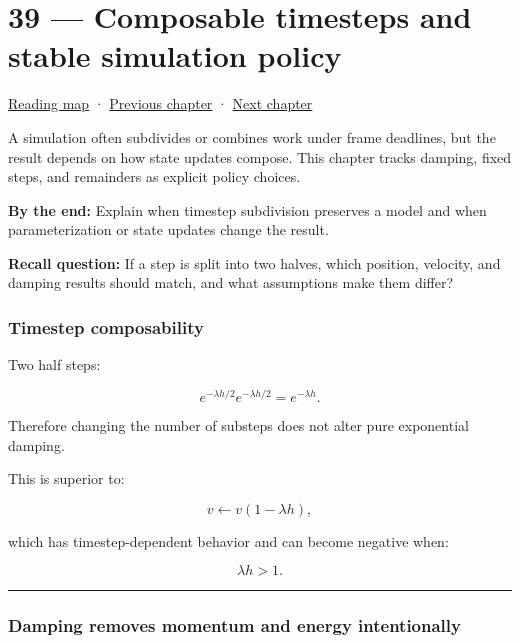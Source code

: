 \hypertarget{06-engine-ii-ch039}{}
\chapter{39 --- Composable timesteps and stable simulation policy}\label{06-engine-ii-ch039-composable-timesteps-and-stable-simulation-policy}

\hyperref[volume-reading-map]{Reading map} · \hyperref[06-engine-ii-ch038-integrator-choices-and-energy-drift]{Previous chapter} · \hyperref[06-engine-ii-ch040-coupled-contacts-and-iterative-response]{Next chapter}

A simulation often subdivides or combines work under frame deadlines, but the result depends on how state updates compose. This chapter tracks damping, fixed steps, and remainders as explicit policy choices.

\textbf{By the end:} Explain when timestep subdivision preserves a model and when parameterization or state updates change the result.

\textbf{Recall question:} If a step is split into two halves, which position, velocity, and damping results should match, and what assumptions make them differ?

\subsection{Timestep composability}\label{06-engine-ii-ch039-timestep-composability}

Two half steps:

\[
e^{-\lambda h/2}
e^{-\lambda h/2}
=
e^{-\lambda h}.
\]

Therefore changing the number of substeps does not alter pure exponential damping.

This is superior to:

\[
v\leftarrow v(1-\lambda h),
\]

which has timestep-dependent behavior and can become negative when:

\[
\lambda h>1.
\]

\begin{center}\rule{0.5\linewidth}{0.5pt}\end{center}

\subsection{Damping removes momentum and energy intentionally}\label{06-engine-ii-ch039-damping-removes-momentum-and-energy-intentionally}

